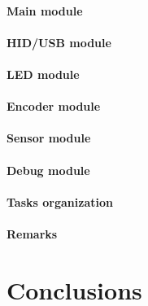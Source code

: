 \documentclass[a4paper,10pt]{article}
\begin{document}
\begin{multicols}{2}
\TODO


\paragraph{Main module}
\TODO


\paragraph{HID/USB module}
\TODO


\paragraph{LED module}
\TODO


\paragraph{Encoder module}
\TODO


\paragraph{Sensor module}
\TODO


\paragraph{Debug module}
\TODO


\paragraph{Tasks organization}
\TODO


\paragraph{Remarks}
\TODO


\section*{Conclusions}
\label{sec:conclusions}

\TODO






\end{multicols}
\end{document}
